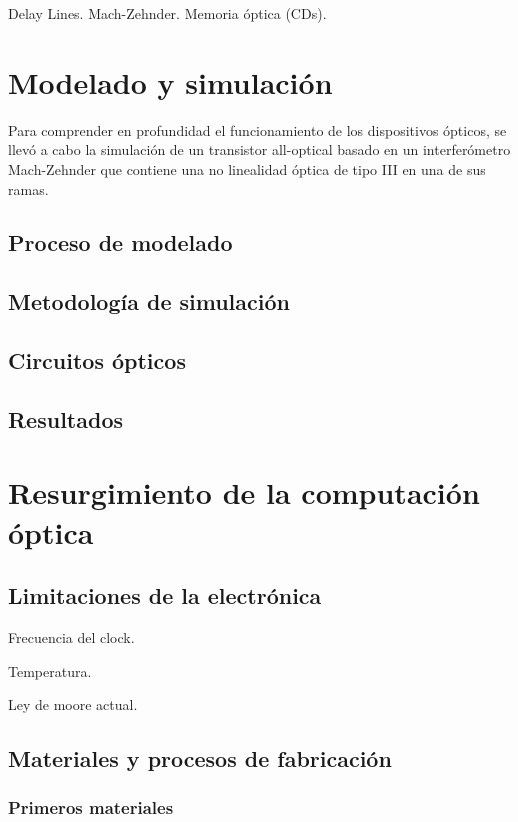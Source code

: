 \documentclass[12pt,a4paper]{report}
\begin{document}
Delay Lines.
Mach-Zehnder.
Memoria óptica (CDs).


\chapter{Modelado y simulación}
Para comprender en profundidad el funcionamiento de los dispositivos ópticos, se llevó a cabo la simulación de un transistor all-optical basado en un interferómetro Mach-Zehnder que contiene una no linealidad óptica de tipo III en una de sus ramas.

\section{Proceso de modelado}

\section{Metodología de simulación}

\section{Circuitos ópticos}

\section{Resultados}



\chapter{Resurgimiento de la computación óptica}

\section{Limitaciones de la electrónica}

Frecuencia del clock.

Temperatura.

Ley de moore actual.

\section{Materiales y procesos de fabricación}

\subsection{Primeros materiales}
\end{document}
